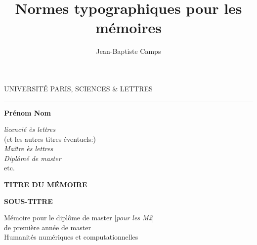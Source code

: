 \documentclass[a4paper,twoside,12pt]{book}
\title{Normes typographiques pour les mémoires}
\author{Jean-Baptiste Camps}
\begin{document}

\frontmatter

\begin{titlepage}
\begin{center}

\bigskip

\begin{large}
UNIVERSITÉ PARIS, SCIENCES \& LETTRES
\end{large}
\begin{center}\rule{2cm}{0.02cm}\end{center}

\bigskip
\bigskip
\bigskip
\begin{Large}
\textbf{Prénom Nom}\\
\end{Large}
\begin{normalsize} \textit{licencié ès lettres}\\
 (et les autres titres éventuels:)\\
\textit{Maître ès lettres}\\
\textit{Diplômé de master}\\
etc.
\end{normalsize}

\bigskip
\bigskip
\bigskip

\begin{Huge}
\textbf{TITRE DU MÉMOIRE}\\
\end{Huge}
\bigskip
\bigskip
\begin{LARGE}
\textbf{SOUS-TITRE}\\
\end{LARGE}

\bigskip
\bigskip
\bigskip
\begin{large}
\end{large}
\vfill

\begin{large}
Mémoire 
pour le diplôme de master [\textit{pour les M2}]\\
de première année de master\\
\og Humanités numériques et computationnelles \fg{} \\
\end{large}

\end{center}
\end{titlepage}

\thispagestyle{empty}
\end{document}
